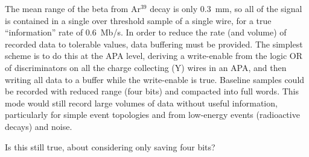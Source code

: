 The mean range of the beta from Ar$^{39}$ decay is only 0.3~mm, so all
of the signal is contained in a single over threshold sample of a single wire, for a true ``information''
rate of 0.6~Mb/s.
In order to
reduce the rate (and volume) of recorded data to tolerable values, 
data buffering must be provided.
The simplest scheme is to do this at the APA level, deriving
a write-enable from the logic OR of discriminators on all the charge
collecting (Y) wires in an APA, and then writing all data to a buffer
while the write-enable is true.
Baseline samples could be recorded
with reduced range (four bits) and compacted into full words.
This mode would still record large volumes of data without useful
information, particularly for simple event topologies and from low-energy 
events (radioactive decays) and noise. 
\begin{editornote}
  Is this still true, about considering only saving four bits?
\end{editornote}






